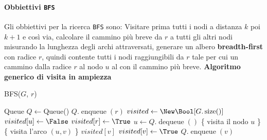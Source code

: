         \paragraph{Obbiettivi \texttt{BFS}} Gli obbiettivi per la ricerca \texttt{BFS} sono: Visitare prima tutti i nodi a distanza $k$ poi $k+1$ e così via, calcolare il cammino più breve da $r$ a tutti gli altri nodi misurando la lunghezza degli archi attraversati, generare un albero \textbf{breadth-first} con radice $r$, quindi contente tutti i nodi raggiungibili da $r$ tale per cui un cammino dalla radice $r$ al nodo $u$ al con il cammino più breve.\newline
        \textbf{Algoritmo generico di visita in ampiezza}
            \begin{algorithm}
                \caption{BFS(\Graph $G$, \Node $r$)}
                \begin{algorithmic}
                    \State Queue $ Q \gets $Queue()
                    \State $ Q.\operatorname{enqueue}(r) $
                    \State \Bool[] $ visited \gets \New \Bool[G.\operatorname{size}()] $
                        \State $ visited[u] \gets \False $
                    \EndFor
                    \State $ visited[r] \gets \True $
                        \State \Node $ u \gets Q.\operatorname{dequeue}() $
                        \State \{ visita il nodo $ u $ \}
                            \State \{ visita l'arco $ (u,v) $ \}
                            \If \Not $ visited[v] $
                                \State $ visited[v] \gets \True $
                                \State $ Q.\operatorname{enqueue}(v) $
                            \EndIf
                        \EndFor
                    \EndWhile
                \end{algorithmic}
            \end{algorithm}

